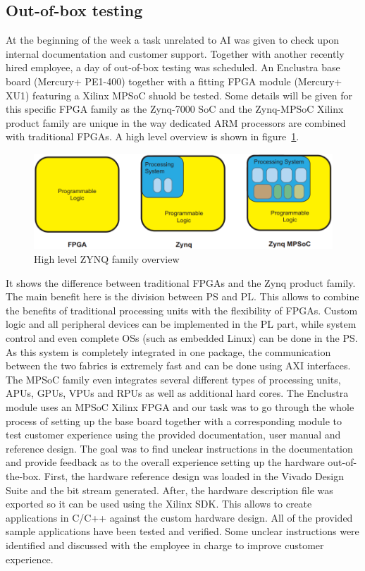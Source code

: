 \subsection{Out-of-box testing}
At the beginning of the week a task unrelated to \ac{AI} was given to check upon internal documentation and customer support. Together with another recently hired employee, a day of out-of-box testing was scheduled. An Enclustra base board (Mercury+ PE1-400) together with a fitting \ac{FPGA} module (Mercury+ XU1) featuring a Xilinx \ac{MPSoC} shuold be tested.
Some details will be given for this specific \ac{FPGA} family as the Zynq-7000 \ac{SoC} and the Zynq-\ac{MPSoC} Xilinx product family are unique in the way dedicated ARM processors are combined with traditional \acp{FPGA}. A high level overview is shown in figure~\ref{fig:zynq-overview}.
\begin{figure}[!htb]
	\centering
		\includegraphics[width=\textwidth]{bilder/ZYNQ-overview.png}
		\caption{High level ZYNQ family overview~\cite{zynq-book}}
		\label{fig:zynq-overview}
\end{figure}
It shows the difference between traditional \acp{FPGA} and the Zynq product family. The main benefit here is the division between \ac{PS} and \ac{PL}. This allows to combine the benefits of traditional processing units with the flexibility of \acp{FPGA}. Custom logic and all peripheral devices can be implemented in the \ac{PL} part, while system control and even complete \acp{OS} (such as embedded Linux) can be done in the \ac{PS}. As this system is completely integrated in one package, the communication between the two fabrics is extremely fast and can be done using \ac{AXI} interfaces. The \ac{MPSoC} family even integrates several different types of processing units, \acp{APU}, \acp{GPU}, \acp{VPU} and \acp{RPU} as well as additional hard cores.
The Enclustra module uses an \ac{MPSoC} Xilinx FPGA and our task was to go through the whole process of setting up the base board together with a corresponding module to test customer experience using the provided documentation, user manual and reference design. The goal was to find unclear instructions in the documentation and provide feedback as to the overall experience setting up the hardware out-of-the-box. First, the hardware reference design was loaded in the Vivado Design Suite and the bit stream generated. After, the hardware description file was exported so it can be used using the Xilinx \ac{SDK}. This allows to create applications in C/C++ against the custom hardware design. All of the provided sample applications have been tested and verified. Some unclear instructions were identified and discussed with the employee in charge to improve customer experience.
